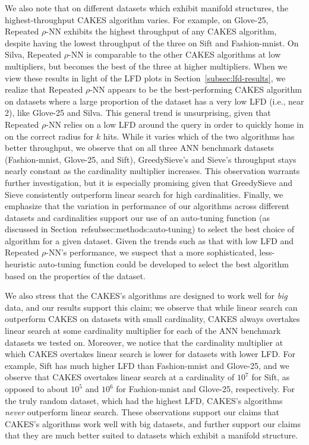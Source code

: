 We also note that on different datasets which exhibit manifold structures, the highest-throughput CAKES algorithm varies. 
For example, on Glove-25, Repeated $\rho$-NN exhibits the highest throughput of any CAKES algorithm, despite having the lowest throughput of the three on Sift and Fashion-mnist. 
On Silva,  Repeated $\rho$-NN is comparable to the other CAKES algorithms at low multipliers, but becomes the best of the three at higher multipliers. 
When we view these results in light of the LFD plots in Section~\ref{subsec:lfd-results}, we realize that  Repeated $\rho$-NN appears to be the best-performing CAKES algorithm on datasets where a large proportion of the dataset has a very low LFD (i.e., near 2), like Glove-25 and Silva. 
This general trend is unsurprising, given that Repeated $\rho$-NN relies on a low LFD around the query in order to quickly home in on the correct radius for $k$ hits. 
While it varies which of the two algorithms has better throughput, we observe that on all three ANN benchmark datasets (Fashion-mnist, Glove-25, and Sift), GreedySieve's and Sieve's throughput stays nearly constant as the cardinality multiplier increases. 
This observation warrants further investigation, but it is especially promising given that GreedySieve and Sieve consistently outperform linear search for high cardinalities. 
Finally, we emphasize that the variation in performance of our algorithms across different datasets and cardinalities support our use of an auto-tuning function (as discussed in Section~ref{subsec:methods:auto-tuning}) to select the best choice of algorithm for a given dataset. 
Given the trends such as that with low LFD and Repeated $\rho$-NN's performance, we suspect that a more sophisticated, less-heuristic auto-tuning function could be developed to select the best algorithm based on the properties of the dataset.


We also stress that the CAKES's algorithms are designed to work well for \emph{big} data, and our results support this claim; we observe that while linear search can outperform CAKES on datasets with small cardinality, CAKES always overtakes linear search at some cardinality multiplier for each of the ANN benchmark datasets we tested on. Moreover, we notice that the cardinality multiplier at which CAKES overtakes linear search is lower for datasets with lower LFD. For example, Sift has much higher LFD than Fashion-mnist and Glove-25, and we observe that CAKES overtakes linear search at a cardinality of $10^7$ for Sift, as opposed to about $10^5$ and $10^6$ for Fashion-mnist and Glove-25, respectively. For the truly random dataset, which had the highest LFD, CAKES's algorithms \emph{never} outperform linear search. These observations support our claims that CAKES's algorithms work well with big datasets, and further support our claims that they are much better suited to datasets which exhibit a manifold structure.


